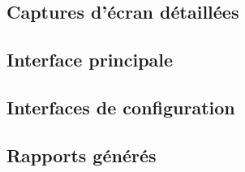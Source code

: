 
\begin{appendices}

    \chapter{Captures d'écran détaillées}
    \label{app:screenshots}


    \section{Interface principale}


    \section{Interfaces de configuration}


    \section{Rapports générés}



\end{appendices}
